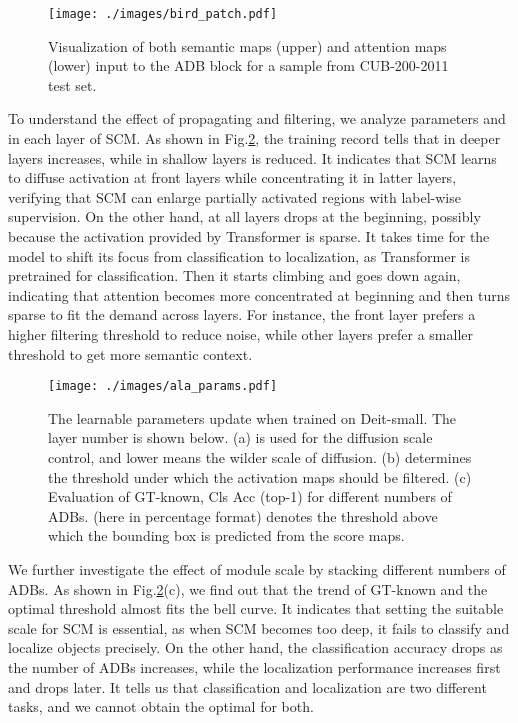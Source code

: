 \documentclass[runningheads]{llncs}
\begin{document}
\begin{figure}[t]
\centering
\texttt{[image: ./images/bird\_patch.pdf]}
\caption{Visualization of both semantic maps  (upper) and attention maps  (lower) input to the  ADB block for a sample from CUB-200-2011 test set.}
\label{fig:fusion_process}
\end{figure}


 To understand the effect of propagating and filtering, we analyze parameters  and  in each layer of SCM. As shown in Fig.\ref{fig:abla_params}, the training record tells that  in deeper layers increases, while  in shallow layers is reduced. 
It indicates that SCM learns to diffuse activation at front layers while concentrating it in latter layers, verifying that SCM can enlarge partially activated regions with label-wise supervision. On the other hand,  at all layers drops at the beginning, possibly because the activation provided by Transformer is sparse. It takes time for the model to shift its focus from classification to localization, as Transformer is pretrained for classification. Then it starts climbing and goes down again, indicating that attention becomes more concentrated at beginning and then turns sparse to fit the demand across layers. For instance, the front layer prefers a higher filtering threshold to reduce noise, while other layers prefer a smaller threshold to get more semantic context.

\begin{figure}[t]
\centering
\texttt{[image: ./images/ala\_params.pdf]}
\caption{
The learnable parameters update when trained on Deit-small. The layer number  is shown below. (a)  is used for the diffusion scale control, and lower  means the wilder scale of diffusion. (b)  determines the threshold under which the activation maps should be filtered. (c) Evaluation of GT-known, Cls Acc (top-1) for different numbers of ADBs.  (here in percentage format) denotes the threshold above which the bounding box is predicted from the score maps.}
\label{fig:abla_params}
\end{figure}

We further investigate the effect of module scale by stacking different numbers of ADBs. As shown in Fig.\ref{fig:abla_params}(c), we find out that the trend of GT-known and the optimal threshold almost fits the bell curve. It indicates that setting the suitable scale for SCM is essential, as when SCM becomes too deep, it fails to classify and localize objects precisely. 
On the other hand, the classification accuracy drops as the number of ADBs increases, while the localization performance increases first and drops later. It tells us that classification and localization are two different tasks, and we cannot obtain the optimal for both. 
\end{document}
